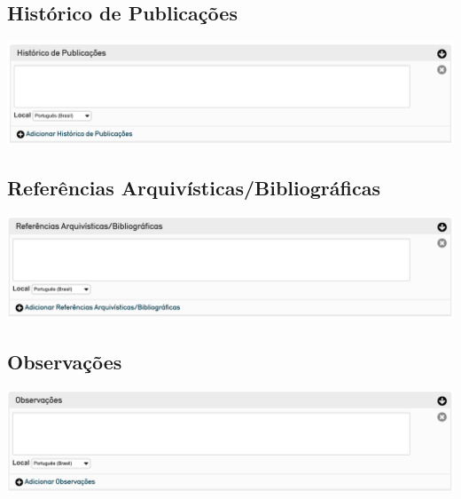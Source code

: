 \subsection{Histórico de Publicações}
\begin{flushleft}
	\includegraphics[width=\linewidth]{elemento-23}
\end{flushleft}

\subsection{Referências Arquivísticas/Bibliográficas}
\begin{flushleft}
	\includegraphics[width=\linewidth]{elemento-24}
\end{flushleft}

\subsection{Observações}
\begin{flushleft}
	\includegraphics[width=\linewidth]{elemento-25}
\end{flushleft}

